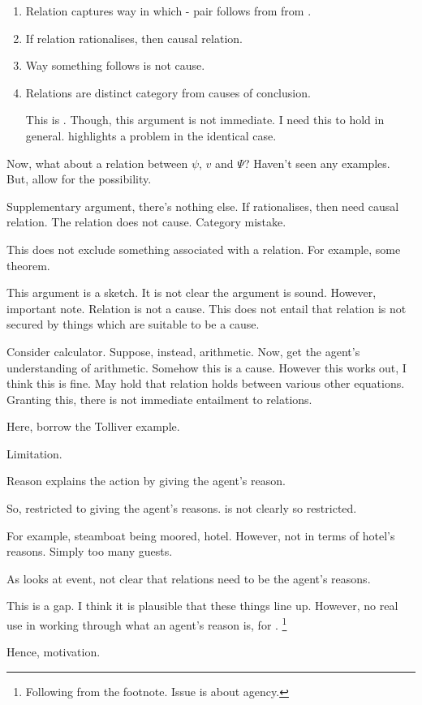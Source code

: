 \begin{note}
  \begin{enumerate}
  \item
    Relation captures way in which - pair follows from \pool{} from \agpe{}.
  \item
    If relation rationalises, then causal relation.
  \item
    Way something follows is not cause.
  \item
    Relations are distinct category from causes of conclusion.

    This is \citeauthor{Carroll:1895uj}.
    Though, this argument is not immediate.
    I need this to hold in general.
    \citeauthor{Carroll:1895uj} highlights a problem in the identical case.
  \end{enumerate}

  Now, what about a relation between \(\psi\), \(v\) and \(\Psi\)?
  Haven't seen any examples.
  But, allow for the possibility.

  Supplementary argument, there's nothing else.
  If rationalises, then need causal relation.
  The relation does not cause.
  Category mistake.

  This does not exclude something associated with a relation.
  For example, some theorem.

  This argument is a sketch.
  It is not clear the argument is sound.
  However, important note.
  Relation is not a cause.
  This does not entail that relation is not secured by things which are suitable to be a cause.

  Consider calculator.
  Suppose, instead, arithmetic.
  Now, get the agent's understanding of arithmetic.
  Somehow this is a cause.
  However this works out, I think this is fine.
  May hold that relation holds between various other equations.
  Granting this, there is not immediate entailment to relations.

  Here, borrow the Tolliver example.
  
\end{note}


\begin{note}
  Limitation.

  Reason explains the action by giving the agent's reason.

  So, restricted to giving the agent's reasons.
  \qWhy{} is not clearly so restricted.

  For example, steamboat being moored, hotel.
  However, not in terms of hotel's reasons.
  Simply too many guests.

  As \qWhy{} looks at event, not clear that relations need to be the agent's reasons.

  This is a gap.
  I think it is plausible that these things line up.
  However, no real use in working through what an agent's reason is, for \citeauthor{Davidson:1963aa}.%
  \footnote{
    Following from the footnote.
    Issue is about agency.
  }

  Hence, motivation.
\end{note}

